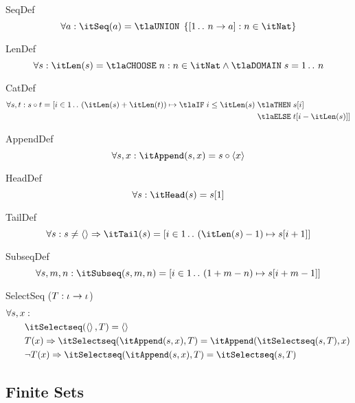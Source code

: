\documentclass[11pt, a4paper, oneside]{article}
\begin{document}
\begin{axioms}
\item[SeqDef] \[
        \forall a : \itSeq(a) = \tlaUNION\; \st{ \bx{ 1 \ltwodots n \arr a } : n \in \itNat }
    \]

\item[LenDef] \[
        \forall s : \itLen(s) = \tlaCHOOSE\; n : n \in \itNat \wedge \tlaDOMAIN\; s = 1 \ltwodots n
    \]

\item[CatDef] \[
        \forall s, t : s \circ t = [ i \in 1 \ltwodots (\itLen(s) + \itLen(t)) \mapsto \tlaIF\; i \le \itLen(s) \;\begin{aligned}[t]
            &\tlaTHEN\; s\!\bx{i} \\
            &\tlaELSE\; t\!\bx{i - \itLen(s)} ]
        \end{aligned}
    \]

\item[AppendDef] \[
        \forall s, x : \itAppend(s, x) = s \circ \tup{ x }
    \]

\item[HeadDef] \[
        \forall s : \itHead(s) = s\!\bx{1}
    \]

\item[TailDef] \[
        \forall s : s \neq \tup{} \imp \itTail(s) = \bx{ i \in 1 \ltwodots (\itLen(s) - 1) \mapsto s\!\bx{i + 1} }
    \]

\item[SubseqDef] \[
        \forall s, m, n : \itSubseq(s, m, n) = \bx{ i \in 1 \ltwodots (1 + m - n) \mapsto s\!\bx{i + m - 1} }
    \]

\item[SelectSeq ($T : \iota \rightarrow \iota$)] \[
        \begin{aligned}
            &\forall s, x : \\
            &\qquad \itSelectseq(\tup{}, T) = \tup{} \\
            &\qquad T(x) \imp \itSelectseq(\itAppend(s, x), T) = \itAppend(\itSelectseq(s, T), x) \\
            &\qquad \neg T(x) \imp \itSelectseq(\itAppend(s, x), T) = \itSelectseq(s, T)
        \end{aligned}
    \]

\end{axioms}


    \subsection{Finite Sets}
    \label{sec:finite}
\end{document}
